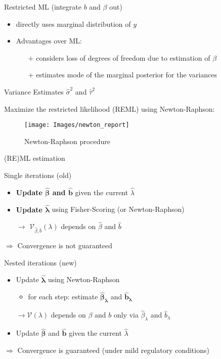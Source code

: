 \documentclass[12pt]{article}
\begin{document}
Restricted ML (integrate $b$ and $\beta$ out)

\begin{itemize}
\item directly uses marginal distribution of $y$

\item Advantages over ML:
\begin{itemize}
\item[$+$] considers loss of degrees of freedom due to estimation of $\beta$ 
\item[$+$] estimates mode of the marginal posterior for the variances
\end{itemize}
\end{itemize}



Variance Estimates $\hat{\sigma}^2$ and $\hat{\tau}^2$

Maximize the restricted likelihood (REML) using Newton-Raphson:

\begin{figure}
\begin{center}
\texttt{[image: Images/newton\_report]}
\end{center}
\vspace{-2em}
\caption[caption]{Newton-Raphson procedure}\label{newton}
\end{figure}






(RE)ML estimation

Single iterations (old)
\begin{itemize}
\item \textbf{Update  $\boldsymbol{\hat{\beta}}$ and $\boldsymbol{\hat{b}}$} given the current $\hat{\lambda}$
\item \textbf{Update $\boldsymbol{\hat{\lambda}}$} using Fisher-Scoring (or Newton-Raphson)

$\rightarrow$ $\mathcal{V}_{\hat{\beta}, \hat{b}}(\lambda)$ depends on $\hat{\beta}$ and $\hat{b}$
\end{itemize}
$\Rightarrow$ Convergence is not guaranteed

Nested iterations (new)
\begin{itemize}
\item Update $\boldsymbol{\hat{\lambda}}$ using Newton-Raphson

\begin{itemize}
\item for each step: estimate $\boldsymbol{\hat{\beta}_\lambda}$ and $\boldsymbol{\hat{b}_\lambda}$
\end{itemize}


$\rightarrow \mathcal{V}(\lambda)$ depends on $\beta$ and $b$ only via $\hat{\beta}_\lambda$ and $\hat{b}_\lambda$

\item Update $\boldsymbol{\hat{\beta}}$ and $\boldsymbol{\hat{b}}$ given the current $\hat{\lambda}$

\end{itemize}
$\Rightarrow$ Convergence is guaranteed (under mild regulatory conditions)
\end{document}
